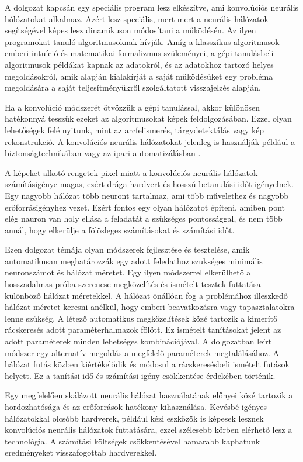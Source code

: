 \documentclass[12pt]{report}
\begin{document}
A dolgozat kapcsán egy speciális program lesz elkészítve, ami konvolúciós neurális hólózatokat alkalmaz. Azért lesz speciális, mert mert a neurális hálózatok segítségével képes lesz dinamikuson módosítani a működésén. Az ilyen programokat tanuló algoritmusoknak hívják. Amíg a klasszíkus algoritmusok emberi intuíció és matematikai formalizmus szüleményei, a gépi tanulásbeli algoritmusok példákat kapnak az adatokról, és az adatokhoz tartozó helyes megoldásokról, amik alapján kialakírját a saját működésüket egy probléma megoldására a saját teljesítményükről szolgáltatott visszajelzés alapján.

Ha a konvolúció módszerét ötvözzük a gépi tanulással, akkor különösen hatékonnyá tesszük ezeket az algoritmusokat képek feldolgozásában. Ezzel olyan lehetőségek felé nyitunk, mint az arcfelismerés, tárgydetektálás vagy kép rekonstrukció. A konvolúciós neurális hálózatokat jelenleg is használják például a biztonságtechnikában vagy az ipari automatizálásban \cite{applications}.

A képeket alkotó rengetek pixel miatt a konvolúciós neurális hálózatok számításigénye magas, ezért drága hardvert és hosszú betanulási időt igényelnek. Egy nagyobb hálózat több neuront tartalmaz, ami több művelethez és nagyobb erőforrásigényhez vezet. Ezért fontos egy olyan hálózatot építeni, amiben pont elég nauron van holy ellása a feladatát a szükséges pontossággal, és nem több annál, hogy elkerülje a fölösleges számításokat és számítási időt.

Ezen dolgozat témája olyan módszerek fejlesztése és tesztelése, amik automatikusan meghatározzák egy adott feledathoz szukséges minimális neuronszámot és hálózat méretet. Egy ilyen módszerrel elkerülhető a hosszadalmas próba-szerencse megközelítés és ismételt tesztek futtatása különböző hálózat méretekkel. A hálózat önállóan fog a problémához illeszkedő hálózat méretet keresni anélkül, hogy emberi beavatkozásra vagy tapasztalatokra lenne szükség. A létező automatikus megközelítések közé tartozik a kimerítő rácskeresés adott paraméterhalmazok fölött. Ez ismételt tanításokat jelent az adott paraméterek minden lehetséges kombinációjával. A dolgozatban leírt módszer egy alternatív megoldás a megfelelő paraméterek megtalálásához. A hálózat futás közben kiértékelődik és módosul a rácskeresésbeli ismételt futások helyett. Ez a tanítási idő és számítási igény csökkentése érdekében történik.

Egy megfelelően skálázott neurális hálózat használatának előnyei közé tartozik a hordozhatósága és az erőforrások hatékony kihasználása. Kevésbé igényes hálózatokkal olcsóbb hardverek, például kézi eszközök is képesek lesznek konvolúciós neurális hálózatok futtatására, ezzel szélesebb körben elérhető lesz a technológia. A számítási költségek csökkentésével hamarabb kaphatunk eredményeket visszafogottab hardverekkel.
\end{document}
